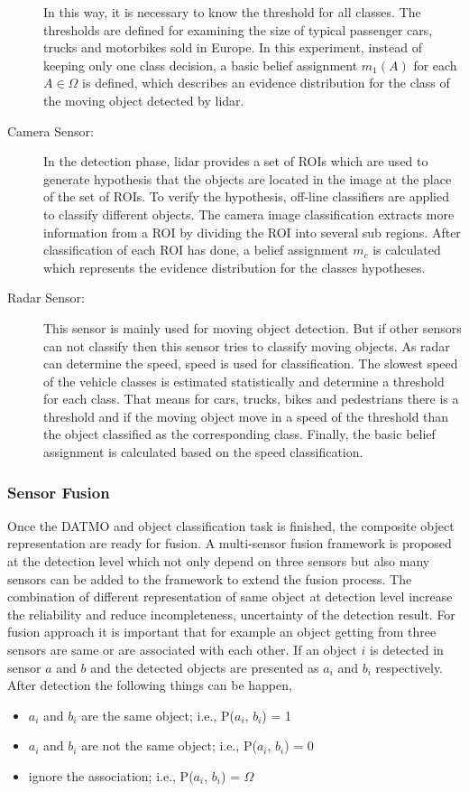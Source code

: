 \begin{description}
    In this way, it is necessary to know the threshold for all classes. The thresholds are defined for examining the size of typical passenger cars, trucks and motorbikes sold in Europe\cite{Chavez_Garcia_2016}. In this experiment, instead of keeping only one class decision, a basic belief assignment $m_{1}(A)$ for each $ A \in \Omega $ is defined, which describes an evidence distribution for the class of the moving object detected by lidar\cite{Chavez_Garcia_2016}.
    \item[Camera Sensor:] In the detection phase, lidar provides a set of ROIs which are used to generate hypothesis that the objects are located in the image at the place of the set of ROIs. To verify the hypothesis, off-line classifiers are applied to classify different objects. The camera image classification extracts more information from a ROI by dividing the ROI into several sub regions. After classification of each ROI has done, a belief assignment $m_{c}$ is calculated which represents the evidence distribution for the classes hypotheses\cite{Chavez_Garcia_2016}.
    \item[Radar Sensor:] This sensor is mainly used for moving object detection. But if other sensors can not classify then this sensor tries to classify moving objects. As radar can determine the speed, speed is used for classification. The slowest speed of the vehicle classes is estimated statistically and determine a threshold for each class. That means for cars, trucks, bikes and pedestrians there is a threshold and if the moving object move in a speed of the threshold than the object classified as the corresponding class. Finally, the basic belief assignment is calculated based on the speed classification\cite{Chavez_Garcia_2016}.
\end{description}

\subsubsection{Sensor Fusion}
Once the DATMO and object classification task is finished, the composite object representation are ready for fusion. A multi-sensor fusion framework is proposed at the detection level which not only depend on three sensors but also many sensors can be added to the framework to extend the fusion process\cite{Chavez_Garcia_2016}. The combination of different representation of same object at detection level increase the reliability and reduce incompleteness, uncertainty of the detection result. For fusion approach it is important that for example an object getting from three sensors are same or are associated with each other. If an object $i$ is detected in sensor $a$ and $b$ and the detected objects are presented as $a_{i}$ and $b_{i}$ respectively. After detection the following things can be happen,
\begin{itemize}
    \item $a_{i}$ and $b_{i}$ are the same object; i.e., P($a_{i}$, $b_{i}$) = 1
    \item $a_{i}$ and $b_{i}$ are not the same object; i.e., P($a_{i}$, $b_{i}$) = 0
    \item ignore the association; i.e., P($a_{i}$, $b_{i}$) = $\Omega$
\end{itemize}

